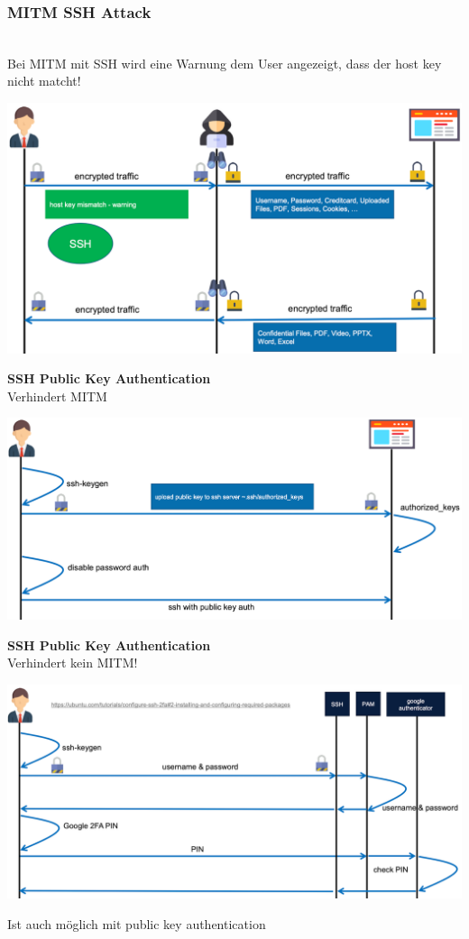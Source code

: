 \subsubsection{MITM SSH Attack}\\
Bei MITM mit SSH wird eine Warnung dem User angezeigt, dass der host key nicht matcht!
\begin{center}
    \vspace{-8pt}
    \includegraphics[width=.8\linewidth]{./img/09-mitm/ssh_overview}
    \vspace{-8pt}
\end{center}

\textbf{SSH Public Key Authentication}\\
Verhindert MITM
\begin{center}
    \vspace{-8pt}
    \includegraphics[width=.8\linewidth]{./img/09-mitm/pk_auth}
    \vspace{-8pt}
\end{center}

\columnbreak

\textbf{SSH Public Key Authentication}\\
Verhindert kein MITM!
\begin{center}
    \vspace{-8pt}
    \includegraphics[width=.8\linewidth]{./img/09-mitm/ssh_2fa}
    \vspace{-8pt}
\end{center}
Ist auch möglich mit public key authentication

